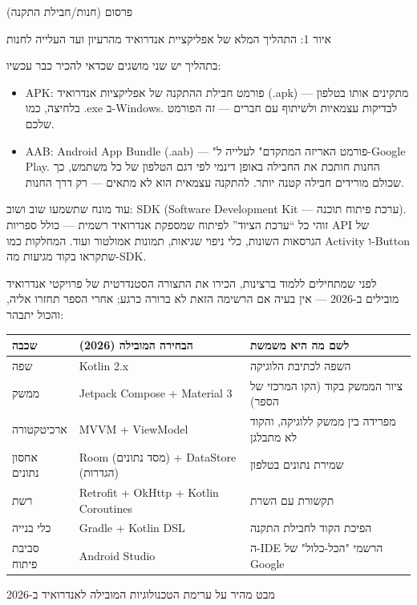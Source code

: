 פרסום (חנות/חבילת התקנה)

\begin{center}\small\color{gray}איור 1: התהליך המלא של אפליקציית אנדרואיד מהרעיון ועד העלייה לחנות\end{center}

בתהליך יש שני מושגים שכדאי להכיר כבר עכשיו:

\begin{itemize}
  \item APK: פורמט חבילת ההתקנה של אפליקציות אנדרואיד (.apk) — מתקינים אותו בטלפון בלחיצה, כמו .exe ב-Windows. לבדיקות עצמאיות ולשיתוף עם חברים — זה הפורמט שלכם.
  \item AAB: Android App Bundle (.aab) — "פורמט האריזה המתקדם" לעלייה ל-Google Play. החנות חותכת את החבילה באופן דינמי לפי דגם הטלפון של כל משתמש, כך שכולם מורידים חבילה קטנה יותר. להתקנה עצמאית הוא לא מתאים — רק דרך החנות.
\end{itemize}

עוד מונח שתשמעו שוב ושוב: SDK (Software Development Kit — ערכת פיתוח תוכנה). זוהי כל “ערכת הציוד” לפיתוח שמספקת אנדרואיד רשמית — כולל ספריות API של הגרסאות השונות, כלי ניפוי שגיאות, תמונות אמולטור ועוד. המחלקות כמו Activity ו-Button שתקראו בקוד מגיעות מה-SDK.


לפני שמתחילים ללמוד ברצינות, הכירו את התצורה הסטנדרטית של פרויקטי אנדרואיד מובילים ב-2026 — אין בעיה אם הרשימה הזאת לא ברורה כרגע; אחרי הספר תחזרו אליה, והכול יתבהר:

\begin{center}
\begin{tabularx}{\linewidth}{|X|X|X|}
\hline
\textbf{שכבה} & \textbf{הבחירה המובילה (2026)} & \textbf{לשם מה היא משמשת} \tabularnewline
\hline
שפה & Kotlin 2.x & השפה לכתיבת הלוגיקה \tabularnewline
ממשק & Jetpack Compose + Material 3 & ציור הממשק בקוד (הקו המרכזי של הספר) \tabularnewline
ארכיטקטורה & MVVM + ViewModel & מפרידה בין ממשק ללוגיקה, והקוד לא מתבלגן \tabularnewline
אחסון נתונים & Room (מסד נתונים) + DataStore (הגדרות) & שמירת נתונים בטלפון \tabularnewline
רשת & Retrofit + OkHttp + Kotlin Coroutines & תקשורת עם השרת \tabularnewline
כלי בנייה & Gradle + Kotlin DSL & הפיכת הקוד לחבילת התקנה \tabularnewline
סביבת פיתוח & Android Studio & ה-IDE הרשמי "הכל-כלול" של Google \tabularnewline
\hline
\end{tabularx}
\end{center}

\begin{center}\small\color{gray}מבט מהיר על ערימת הטכנולוגיות המובילה לאנדרואיד ב-2026\end{center}

